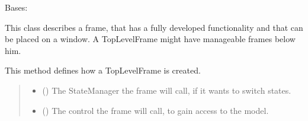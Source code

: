 \documentclass[letterpaper,10pt,english]{sphinxmanual}
\begin{document}
\begin{fulllineitems}
\label{\detokenize{apidoc/src.osm_configurator.view.toplevelframes:src.osm_configurator.view.toplevelframes.top_level_frame.TopLevelFrame}}
\pysigstartsignatures
{}
\pysigstopsignatures
\sphinxAtStartPar
Bases: 

\sphinxAtStartPar
This class describes a frame, that has a fully developed functionality and that can be placed on a window.
A TopLevelFrame might have manageable frames below him.

\begin{fulllineitems}
\label{\detokenize{apidoc/src.osm_configurator.view.toplevelframes:src.osm_configurator.view.toplevelframes.top_level_frame.TopLevelFrame.__init__}}
\pysigstartsignatures
{}
\pysigstopsignatures
\sphinxAtStartPar
This method defines how a TopLevelFrame is created.
\begin{quote}\begin{description}
\begin{itemize}
\item {} 
\sphinxAtStartPar
{} ({\hyperref[\detokenize{apidoc/src.osm_configurator.view.states:src.osm_configurator.view.states.state_manager.StateManager}]{}}) \textendash{} The StateManager the frame will call, if it wants to switch states.

\item {} 
\sphinxAtStartPar
{} ({\hyperref[\detokenize{apidoc/src.osm_configurator.control:src.osm_configurator.control.control_interface.IControl}]{}}) \textendash{} The control the frame will call, to gain access to the model.

\end{itemize}


\end{description}
\end{quote}
\end{fulllineitems}
\end{fulllineitems}
\end{document}
